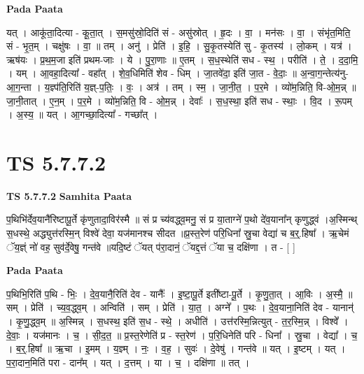 \documentclass[17pt]{extarticle}
\begin{document}
\textbf{Pada Paata} \newline

यत् । आकू॑ता॒दित्या - कू॒ता॒त् । स॒मसु॑स्रो॒दिति॑ सं - असु॑स्रोत् । हृ॒दः । वा॒ । मन॑सः । वा॒ । संभृ॑त॒मिति॒ सं - भृ॒त॒म् । चक्षु॑षः । वा॒ ॥ तम् । अनु॑ । प्रेति॑ । इ॒हि॒ । सु॒कृ॒तस्येति॑ सु - कृ॒तस्य॑ । लो॒कम् । यत्र॑ । ऋष॑यः । प्र॒थ॒म॒जा इति॑ प्रथम-जाः । ये । पु॒रा॒णाः ॥ ए॒तम् । स॒ध॒स्थेति॑ सध - स्थ॒ । परीति॑ । ते॒ । द॒दा॒मि॒ । यम् । आ॒वहा॒दित्या᳚ - वहा᳚त् । शे॒व॒धिमिति॑ शेव - धिम् । जा॒तवे॑दा॒ इति॑ जा॒त - वे॒दाः॒ ॥ अ॒न्वा॒ग॒न्तेत्य॑नु-आ॒ग॒न्ता । य॒ज्ञ्प॑ति॒रिति॑ य॒ज्ञ्-प॒तिः॒ । वः॒ । अत्र॑ । तम् । स्म॒ । जा॒नी॒त॒ । प॒र॒मे । व्यो॑म॒न्निति॒ वि-ओ॒म॒न्न् ॥ जा॒नी॒तात् । ए॒न॒म् । प॒र॒मे । व्यो॑म॒न्निति॒ वि - ओ॒म॒न्न् । देवाः᳚ । स॒ध॒स्था॒ इति॑ सध - स्थाः॒ । वि॒द । रू॒पम् । अ॒स्य॒ ॥ यत् । आ॒गच्छा॒दित्या᳚ - गच्छा᳚त् ।  \newline




\section*{ TS 5.7.7.2 }

\textbf{TS 5.7.7.2 } \newline
\textbf{Samhita Paata} \newline

प॒थिभि॑र्देव॒यानै॑रिष्टापू॒र्ते कृ॑णुतादा॒विर॑स्मै ॥ सं प्र च्य॑वद्ध्व॒मनु॒ सं प्र या॒ताग्ने॑ प॒थो दे॑व॒याना᳚न् कृणुद्ध्वं ।अ॒स्मिन्थ् स॒धस्थे॒ अद्ध्युत्त॑रस्मि॒न् विश्वे॑ देवा॒ यज॑मानश्च सीदत ॥प्र॒स्त॒रेण॑ परि॒धिना᳚ स्रु॒चा वेद्या॑ च ब॒र्॒.हिषा᳚ । ऋ॒चेमं ॅय॒ज्ञ्ं नो॑ वह॒ सुव॑र्दे॒वेषु॒ गन्त॑वे ॥यदि॒ष्टं ॅयत् प॑रा॒दानं॒ ॅयद्द॒त्तं ॅया च॒ दक्षि॑णा । त - [  ] \newline

\textbf{Pada Paata} \newline

प॒थिभि॒रिति॑ प॒थि - भिः॒ । दे॒व॒यानै॒रिति॑ देव - यानैः᳚ । इ॒ष्टा॒पू॒र्ते इती᳚ष्टा-पू॒र्ते । कृ॒णु॒ता॒त् । आ॒विः । अ॒स्मै॒ ॥ सम् । प्रेति॑ । च्य॒व॒द्ध्व॒म् । अन्विति॑ । सम् । प्रेति॑ । या॒त॒ । अग्ने᳚ । प॒थः । दे॒व॒याना॒निति॑ देव - यानान्॑ । कृ॒णु॒द्ध्व॒म् ॥ अ॒स्मिन्न् । स॒धस्थ॒ इति॑ स॒ध - स्थे॒ । अधीति॑ । उत्त॑रस्मि॒न्नित्युत् - त॒र॒स्मि॒न्न् । विश्वे᳚ । दे॒वाः॒ । यज॑मानः । च॒ । सी॒द॒त॒ ॥ प्र॒स्त॒रेणेति॑ प्र - स्त॒रेण॑ । प॒रि॒धिनेति॑ परि - धिना᳚ । स्रु॒चा । वेद्या᳚ । च॒ । ब॒र्॒.हिषा᳚ ॥ ऋ॒चा । इ॒मम् । य॒ज्ञ्म् । नः॒ । व॒ह॒ । सुवः॑ । दे॒वेषु॑ । गन्त॑वे ॥ यत् । इ॒ष्टम् । यत् । प॒रा॒दान॒मिति॑ परा - दान᳚म् । यत् । द॒त्तम् । या । च॒ । दक्षि॑णा ॥ तत् ।  \newline
\end{document}
